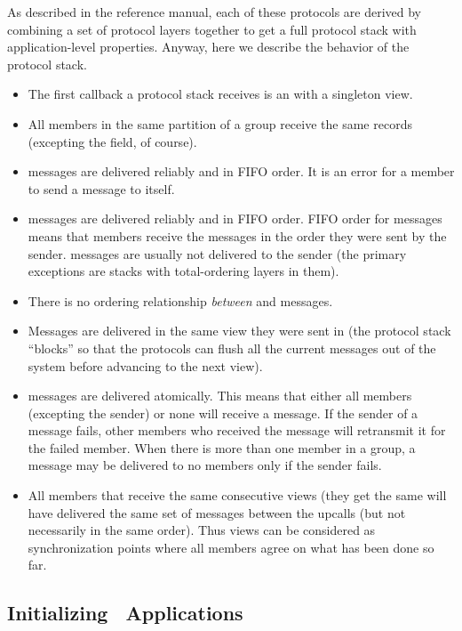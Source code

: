 As described in the reference manual, each of these protocols are derived by
combining a set of protocol layers together to get a full protocol stack with
application-level properties.  Anyway, here we describe the behavior of the
 protocol stack.
\begin{itemize}
\item
The first callback a protocol stack receives is an
 with a singleton view.
\item
All members in the same partition of a group receive the same
 records (excepting the  field, of
course).
\item
{} messages are delivered reliably and in FIFO order.  It is
an error for a member to send a message to itself.
\item
{} messages are delivered reliably and in FIFO order.  FIFO
order for  messages means that members receive the
messages in the order they were sent by the sender.  
messages are usually not delivered to the sender (the primary
exceptions are stacks with total-ordering layers in them).
\item
There is no ordering relationship \emph{between}  and
 messages.
\item
Messages are delivered in the same view they were sent in (the
protocol stack ``blocks'' so that the protocols can flush all the
current messages out of the system before advancing to the next view).
\item
{} messages are delivered atomically.  This means that
either all members (excepting the sender) or none will receive a
 message.  If the sender of a  message fails,
other members who received the message will retransmit it for the
failed member.  When there is more than one member in a group, a
 message may be delivered to no members only if the sender
fails.
\item
All members that receive the same consecutive views (they get the same
 will have delivered the same set of
 messages between the upcalls (but not necessarily in the
same order).  Thus views can be considered as synchronization points
where all members agree on what has been done so far.
\end{itemize}

\subsection{Initializing \ensemble\ Applications}

